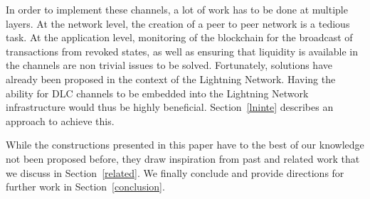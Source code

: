 In order to implement these channels, a lot of work has to be done at multiple layers.
At the network level, the creation of a peer to peer network is a tedious task.
At the application level, monitoring of the blockchain for the broadcast of transactions from revoked states, as well as ensuring that liquidity is available in the channels are non trivial issues to be solved.
Fortunately, solutions have already been proposed in the context of the Lightning Network.
Having the ability for DLC channels to be embedded into the Lightning Network infrastructure would thus be highly beneficial.
Section~\ref{lninte} describes an approach to achieve this.

While the constructions presented in this paper have to the best of our knowledge not been proposed before, they draw inspiration from past and related work that we discuss in Section~\ref{related}.
We finally conclude and provide directions for further work in Section~\ref{conclusion}.